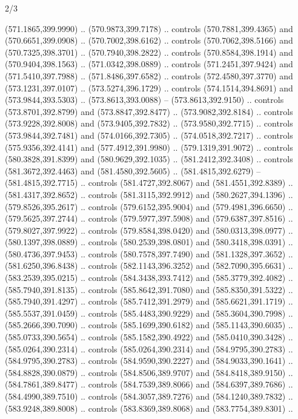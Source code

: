 \begin{flagdescription}{2/3}
\begin{scope}[xshift=0.5\flaglength,yshift=0.5\flagwidth,scale=\flagwidth/495.65]
\begin{scope}[y=0.8pt, x=0.8pt, yscale=-1,shift={(-463.76,-309.78)}]
  (571.1865,399.9990) .. (570.9873,399.7178) .. controls (570.7881,399.4365) and
  (570.6651,399.0908) .. (570.7002,398.6162) .. controls (570.7062,398.5166) and
  (570.7325,398.3701) .. (570.7940,398.2822) .. controls (570.8584,398.1914) and
  (570.9404,398.1563) .. (571.0342,398.0889) .. controls (571.2451,397.9424) and
  (571.5410,397.7988) .. (571.8486,397.6582) .. controls (572.4580,397.3770) and
  (573.1231,397.0107) .. (573.5274,396.1729) .. controls (574.1514,394.8691) and
  (573.9844,393.5303) .. (573.8613,393.0088) -- (573.8613,392.9150) .. controls
  (573.8701,392.8799) and (573.8847,392.8477) .. (573.9082,392.8184) .. controls
  (573.9228,392.8008) and (573.9405,392.7832) .. (573.9580,392.7715) .. controls
  (573.9844,392.7481) and (574.0166,392.7305) .. (574.0518,392.7217) .. controls
  (575.9356,392.4141) and (577.4912,391.9980) .. (579.1319,391.9072) .. controls
  (580.3828,391.8399) and (580.9629,392.1035) .. (581.2412,392.3408) .. controls
  (581.3672,392.4463) and (581.4580,392.5605) .. (581.4815,392.6279) --
  (581.4815,392.7715) .. controls (581.4727,392.8067) and (581.4551,392.8389) ..
  (581.4317,392.8652) .. controls (581.3115,392.9912) and (580.2627,394.1396) ..
  (579.8526,395.2617) .. controls (579.6152,395.9004) and (579.4981,396.6650) ..
  (579.5625,397.2744) .. controls (579.5977,397.5908) and (579.6387,397.8516) ..
  (579.8027,397.9922) .. controls (579.8584,398.0420) and (580.0313,398.0977) ..
  (580.1397,398.0889) .. controls (580.2539,398.0801) and (580.3418,398.0391) ..
  (580.4736,397.9453) .. controls (580.7578,397.7490) and (581.1328,397.3652) ..
  (581.6250,396.8438) .. controls (582.1143,396.3252) and (582.7090,395.6631) ..
  (583.2539,395.0215) .. controls (584.3438,393.7412) and (585.3779,392.4082) ..
  (585.7940,391.8135) .. controls (585.8642,391.7080) and (585.8350,391.5322) ..
  (585.7940,391.4297) .. controls (585.7412,391.2979) and (585.6621,391.1719) ..
  (585.5537,391.0459) .. controls (585.4483,390.9229) and (585.3604,390.7998) ..
  (585.2666,390.7090) .. controls (585.1699,390.6182) and (585.1143,390.6035) ..
  (585.0733,390.5654) .. controls (585.1582,390.4922) and (585.0410,390.3428) ..
  (585.0264,390.2314) .. controls (585.0264,390.2314) and (584.9795,390.2783) ..
  (584.9795,390.2783) .. controls (584.9590,390.2227) and (584.9033,390.1641) ..
  (584.8828,390.0879) .. controls (584.8506,389.9707) and (584.8418,389.9150) ..
  (584.7861,389.8477) .. controls (584.7539,389.8066) and (584.6397,389.7686) ..
  (584.4990,389.7510) .. controls (584.3057,389.7276) and (584.1240,389.7832) ..
  (583.9248,389.8008) .. controls (583.8369,389.8068) and (583.7754,389.8301) ..

\end{scope}
\end{scope}
\end{flagdescription}
